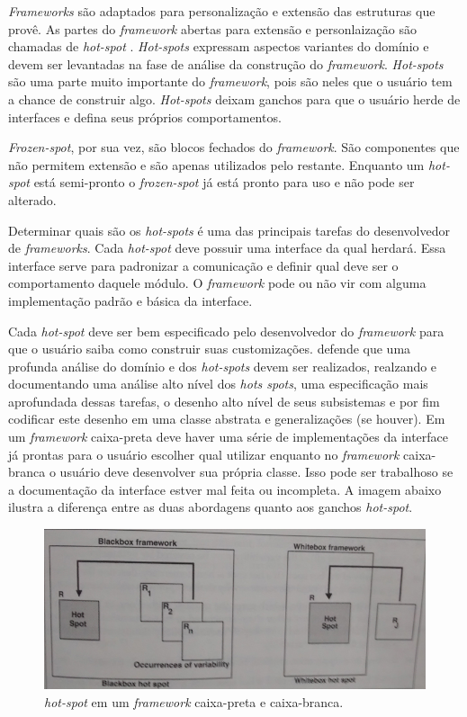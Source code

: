\textit{Frameworks} são adaptados para personalização e extensão das estruturas que provê. As partes do \textit{framework} abertas para extensão e personlaização são chamadas de \textit{hot-spot} \cite{Fayad1999}. \textit{Hot-spots} expressam aspectos variantes do domínio e devem ser levantadas na fase de análise da construção do \textit{framework}. \textit{Hot-spots} são uma parte muito importante do \textit{framework}, pois são neles que o usuário tem a chance de construir algo. \textit{Hot-spots} deixam ganchos para que o usuário herde de interfaces e defina seus próprios comportamentos.

\textit{Frozen-spot}, por sua vez, são blocos fechados do \textit{framework}. São componentes que não permitem extensão e são apenas utilizados pelo restante. Enquanto um \textit{hot-spot} está semi-pronto o \textit{frozen-spot} já está pronto para uso e não pode ser alterado.

Determinar quais são os \textit{hot-spots} é uma das principais tarefas do desenvolvedor de \textit{frameworks}. Cada \textit{hot-spot} deve possuir uma interface da qual herdará. Essa interface serve para padronizar a comunicação e definir qual deve ser o comportamento daquele módulo. O \textit{framework} pode ou não vir com alguma implementação padrão e básica da interface.

Cada \textit{hot-spot} deve ser bem especificado pelo desenvolvedor do \textit{framework} para que o usuário saiba como construir suas customizações. \cite{Fayad1999} defende que uma profunda análise do domínio e dos \textit{hot-spots} devem ser realizados, realzando e documentando uma análise alto nível dos \textit{hots spots}, uma especificação mais aprofundada dessas tarefas, o desenho alto nível de seus subsistemas e por fim codificar este desenho em uma classe abstrata e generalizações (se houver). Em um \textit{framework} caixa-preta deve haver uma série de implementações da interface já prontas para o usuário escolher qual utilizar enquanto no \textit{framework} caixa-branca o usuário deve desenvolver sua própria classe. Isso pode ser trabalhoso se a documentação da interface estver mal feita ou incompleta. A imagem abaixo ilustra a diferença entre as duas abordagens quanto aos ganchos \textit{hot-spot}.

\begin{figure}[h]
	\centering
	\label{fig12}
		\includegraphics[keepaspectratio=true,scale=0.3]{figuras/hotspotbox.jpg}
	\caption{\textit{hot-spot} em um \textit{framework} caixa-preta e caixa-branca. \cite{Fayad1999}}
\end{figure}

